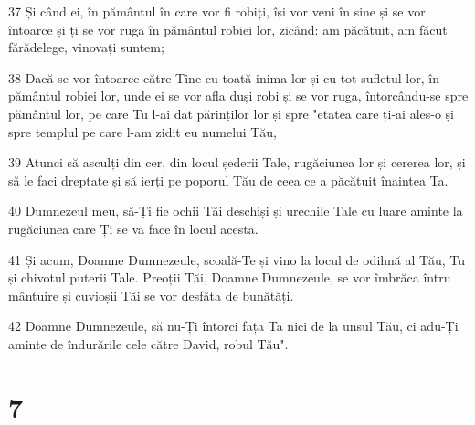 \par 37 Și când ei, în pământul în care vor fi robiți, își vor veni în sine și se vor întoarce și ți se vor ruga în pământul robiei lor, zicând: am păcătuit, am făcut fărădelege, vinovați suntem;
\par 38 Dacă se vor întoarce către Tine cu toată inima lor și cu tot sufletul lor, în pământul robiei lor, unde ei se vor afla duși robi și se vor ruga, întorcându-se spre pământul lor, pe care Tu l-ai dat părinților lor și spre "etatea care ți-ai ales-o și spre templul pe care l-am zidit eu numelui Tău,
\par 39 Atunci să asculți din cer, din locul șederii Tale, rugăciunea lor și cererea lor, și să le faci dreptate și să ierți pe poporul Tău de ceea ce a păcătuit înaintea Ta.
\par 40 Dumnezeul meu, să-Ți fie ochii Tăi deschiși și urechile Tale cu luare aminte la rugăciunea care Ți se va face în locul acesta.
\par 41 Și acum, Doamne Dumnezeule, scoală-Te și vino la locul de odihnă al Tău, Tu și chivotul puterii Tale. Preoții Tăi, Doamne Dumnezeule, se vor îmbrăca întru mântuire și cuvioșii Tăi se vor desfăta de bunătăți.
\par 42 Doamne Dumnezeule, să nu-Ți întorci fața Ta nici de la unsul Tău, ci adu-Ți aminte de îndurările cele către David, robul Tău".

\chapter{7}

